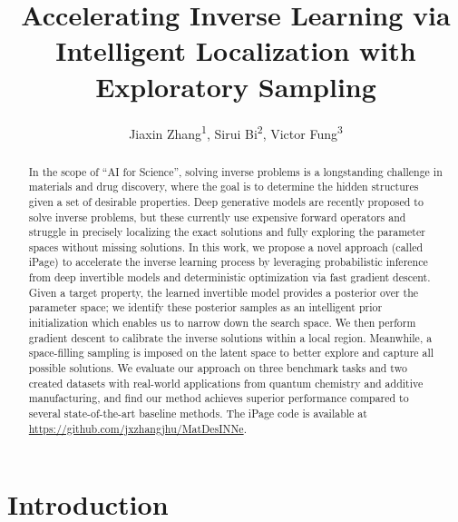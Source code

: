 \documentclass[letterpaper]{article}
\title{Accelerating Inverse Learning via Intelligent Localization with \\ Exploratory Sampling}
\author {
    Jiaxin Zhang\textsuperscript{\rm 1},
    Sirui Bi\textsuperscript{\rm 2},
    Victor Fung\textsuperscript{\rm 3}
}
\begin{document}
\maketitle

\begin{abstract}
In the scope of ``AI for Science'', solving inverse problems is a longstanding challenge in materials and drug discovery, where the goal is to determine the hidden structures given a set of desirable properties. Deep generative models are recently proposed to solve inverse problems, but these currently use expensive forward operators and struggle in precisely localizing the exact solutions and fully exploring the parameter spaces without missing solutions. In this work, we propose a novel approach (called {iPage}) to accelerate the inverse learning process by leveraging probabilistic inference from deep invertible models and deterministic optimization via fast gradient descent. Given a target property, the learned invertible model provides a posterior over the parameter space; we identify these posterior samples as an intelligent prior initialization which enables us to narrow down the search space. We then perform gradient descent to calibrate the inverse solutions within a local region. Meanwhile, a space-filling sampling is imposed on the latent space to better explore and capture all possible solutions. We evaluate our approach on three benchmark tasks and two created datasets with real-world applications from quantum chemistry and additive manufacturing, and find our method achieves superior performance compared to several state-of-the-art baseline methods. The iPage code is available at \url{https://github.com/jxzhangjhu/MatDesINNe}.
\end{abstract}

\section{Introduction}
\label{intro}
\end{document}
